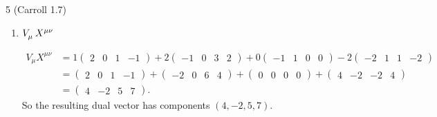 \documentclass[11pt]{article}
\begin{document}
\begin{problem}{5 (Carroll 1.7)}
\begin{enumerate}[label=(\alph*)]
\begin{answer}
\begin{equation}
		      \end{equation}
		      \end{answer}
		\item \( \tensor{V}{^{}_{\mu}} \tensor{X}{^{\mu\nu}_{}}\)
\begin{answer}
		      \begin{equation}
		      \begin{aligned}
		      V_\mu X^{\mu\nu} &= 1 \begin{pmatrix} 2 & 0 & 1 & -1 \end{pmatrix} + 2 \begin{pmatrix} -1 & 0 & 3 & 2 \end{pmatrix} + 0 \begin{pmatrix} -1 & 1 & 0 & 0 \end{pmatrix} - 2 \begin{pmatrix} -2 & 1 & 1 & -2 \end{pmatrix} \\
		      &= \begin{pmatrix} 2 & 0 & 1 & -1 \end{pmatrix} + \begin{pmatrix} -2 & 0 & 6 & 4 \end{pmatrix} + \begin{pmatrix} 0 & 0 & 0 & 0 \end{pmatrix} + \begin{pmatrix} 4 & -2 & -2 & 4 \end{pmatrix} \\
		      &= \begin{pmatrix} 4 & -2 & 5 & 7 \end{pmatrix}.
		      \end{aligned}
		      \end{equation}
		      So the resulting dual vector has components \( (4, -2, 5, 7) \).
		      \end{answer}
	\end{enumerate}
\end{problem}
\end{document}
